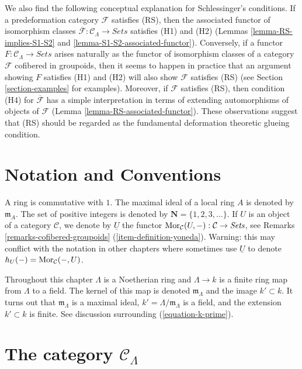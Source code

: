 \medskip \noindent
We also find the following conceptual explanation for Schlessinger's
conditions. If a predeformation category $\mathcal{F}$ satisfies (RS),
then the associated functor of isomorphism classes
$\overline{\mathcal{F}}: \mathcal{C}_\Lambda \to \textit{Sets}$
satisfies (H1) and (H2)
(Lemmas \ref{lemma-RS-implies-S1-S2} and
\ref{lemma-S1-S2-associated-functor}).
Conversely, if a functor
$F : \mathcal{C}_\Lambda \to \textit{Sets}$
arises naturally as the functor of isomorphism classes of
a category $\mathcal{F}$ cofibered in groupoids, then it seems to happen in
practice that an argument showing $F$ satisfies (H1) and (H2) will also show
$\mathcal{F}$ satisfies (RS) (see
Section \ref{section-examples}
for examples). Moreover, if $\mathcal{F}$ satisfies (RS), then condition
(H4) for $\overline{\mathcal{F}}$ has a simple interpretation in terms of
extending automorphisms of objects of $\mathcal{F}$
(Lemma \ref{lemma-RS-associated-functor}).
These observations suggest that (RS) should be regarded as the
fundamental deformation theoretic glueing condition.




\section{Notation and Conventions}
\label{section-notations-conventions}

\noindent
A ring is commutative with $1$. The  maximal ideal of a local ring $A$
is denoted by $\mathfrak{m}_A$. The set of positive integers is denoted
by $\mathbf{N} = \{1, 2, 3, \dots\}$. If $U$ is an object of a
category $\mathcal{C}$, we denote by $\underline{U}$
the functor
$\mathop{\rm Mor}\nolimits_\mathcal{C}(U, -): \mathcal{C} \to \textit{Sets}$, see
Remarks \ref{remarks-cofibered-groupoids} (\ref{item-definition-yoneda}).
Warning: this may conflict with the notation in other chapters where sometimes
use $\underline{U}$ to denote $h_U(-) = \mathop{\rm Mor}\nolimits_\mathcal{C}(-, U)$.

\medskip\noindent
Throughout this chapter $\Lambda$ is a Noetherian ring and
$\Lambda \to k$ is a finite ring map from $\Lambda$ to a field.
The kernel of this map is denoted $\mathfrak m_\Lambda$ and the
image $k' \subset k$. It turns out that $\mathfrak m_\Lambda$ is
a maximal ideal, $k' = \Lambda/\mathfrak m_\Lambda$ is a field, and
the extension $k' \subset k$ is finite. See discussion surrounding
(\ref{equation-k-prime}).


\section{The category $\mathcal{C}_\Lambda$}
\label{section-CLambda}

